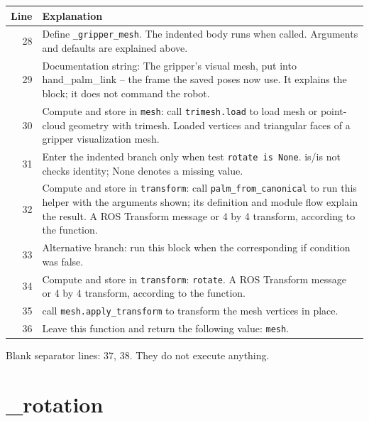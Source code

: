 \documentclass[11pt,a4paper]{book}
\begin{document}
\begin{longtable}{r p{}}

\textbf{Line} & \textbf{Explanation} \\ \hline \endhead

28 & Define \texttt{\_gripper\_mesh}. The indented body runs when called. Arguments and defaults are explained above. \\

29 & Documentation string: The gripper's visual mesh, put into hand\_palm\_link -- the frame the saved poses now use. It explains the block; it does not command the robot. \\

30 & Compute and store in \texttt{mesh}: call \texttt{trimesh.load} to load mesh or point-cloud geometry with trimesh. Loaded vertices and triangular faces of a gripper visualization mesh. \\

31 & Enter the indented branch only when test \texttt{rotate is None}. is/is not checks identity; None denotes a missing value. \\

32 & Compute and store in \texttt{transform}: call \texttt{palm\_from\_canonical} to run this helper with the arguments shown; its definition and module flow explain the result. A ROS Transform message or 4 by 4 transform, according to the function. \\

33 & Alternative branch: run this block when the corresponding if condition was false. \\

34 & Compute and store in \texttt{transform}: \texttt{rotate}. A ROS Transform message or 4 by 4 transform, according to the function. \\

35 & call \texttt{mesh.apply\_transform} to transform the mesh vertices in place. \\

36 & Leave this function and return the following value: \texttt{mesh}. \\

\end{longtable}

Blank separator lines: 37, 38. They do not execute anything.

\section{\_rotation}
\end{document}

